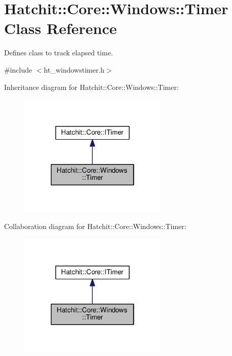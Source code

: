 \hypertarget{classHatchit_1_1Core_1_1Windows_1_1Timer}{}\section{Hatchit\+:\+:Core\+:\+:Windows\+:\+:Timer Class Reference}
\label{classHatchit_1_1Core_1_1Windows_1_1Timer}


Defines class to track elapsed time.  




{\ttfamily \#include $<$ht\+\_\+windowstimer.\+h$>$}



Inheritance diagram for Hatchit\+:\+:Core\+:\+:Windows\+:\+:Timer\+:
\nopagebreak
\begin{figure}[H]
\begin{center}
\leavevmode
\includegraphics[width=202pt]{classHatchit_1_1Core_1_1Windows_1_1Timer__inherit__graph}
\end{center}
\end{figure}


Collaboration diagram for Hatchit\+:\+:Core\+:\+:Windows\+:\+:Timer\+:
\nopagebreak
\begin{figure}[H]
\begin{center}
\leavevmode
\includegraphics[width=202pt]{classHatchit_1_1Core_1_1Windows_1_1Timer__coll__graph}
\end{center}
\end{figure}

